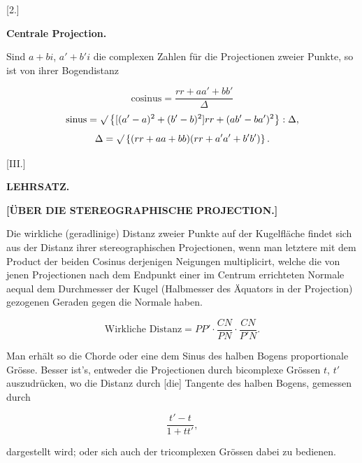 
\begin{center}
[2.]
\end{center}

\begin{center}
\bfseries Centrale Projection.
\end{center}

Sind $a+bi$, $a'+b'i$ die complexen Zahlen für die Projectionen zweier Punkte, so ist von ihrer Bogendistanz

\[
\text{cosinus} = \frac{rr+aa'+bb'}{\Delta}
\]
\[
\text{sinus} = \mathord{\surd}\left\{[(a'-a)^2+(b'-b)^2]rr+(ab'-ba')^2\right\}:\Delta,
\]
\[
\Delta = \mathord{\surd}\left\{(rr+aa+bb)(rr+a'a'+b'b')\right\}.
\]

\begin{center}
[III.]
\end{center}

\begin{center}
\bfseries LEHRSATZ.
\end{center}

\begin{center}
\bfseries [ÜBER DIE STEREOGRAPHISCHE PROJECTION.]
\end{center}

Die wirkliche (geradlinige) Distanz zweier Punkte auf der Kugelfläche findet sich aus der Distanz ihrer stereographischen Projectionen, wenn man letztere mit dem Product der beiden Cosinus derjenigen Neigungen multiplicirt, welche die von jenen Projectionen nach dem Endpunkt einer im Centrum errichteten Normale aequal dem Durchmesser der Kugel (Halbmesser des Äquators in der Projection) gezogenen Geraden gegen die Normale haben.

\[
\text{Wirkliche Distanz} = PP'\cdot\frac{CN}{PN}\cdot\frac{CN}{P'N}.
\]

\begin{center}\end{center}
\indent Man erhält so die Chorde oder eine dem Sinus des halben Bogens proportionale Grösse. Besser ist's, entweder die Projectionen durch bicomplexe Grössen $t$, $t'$ auszudrücken, wo die Distanz durch [die] Tangente des halben Bogens, gemessen durch

\[
\frac{t'-t}{1+tt'},
\]

\noindent dargestellt wird; oder sich auch der tricomplexen Grössen dabei zu bedienen.


